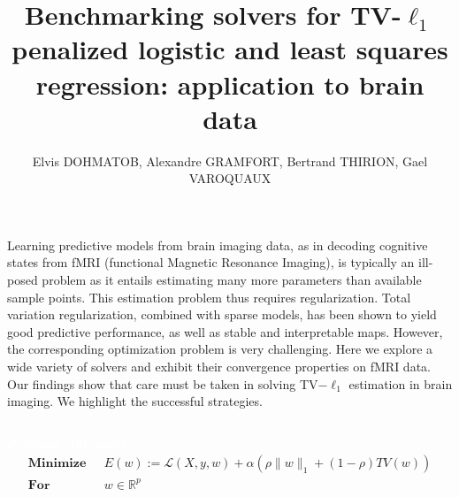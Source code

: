 \documentclass[french]{STIC_poster}
\title{Benchmarking solvers for TV-$\ell_1$ penalized logistic and least squares regression: application to brain data}			%
\author{Elvis DOHMATOB, Alexandre GRAMFORT, Bertrand THIRION, Gael VAROQUAUX}		%
\begin{document}
	\begin{frame}[t]
            Learning predictive models from brain imaging data, as in decoding
            cognitive states from fMRI (functional Magnetic Resonance Imaging),
            is typically an ill-posed problem as it
            entails estimating many more parameters than available sample
            points. This estimation problem thus requires regularization. Total
            variation regularization, combined with sparse models, has been shown
            to yield good predictive performance, as well as stable and
            interpretable maps. However, the corresponding optimization problem is
            very challenging. %
            Here we explore a wide variety of solvers and exhibit
            their convergence properties on fMRI data. %
            Our findings show that care must be taken in solving
            TV$-\ell_1$ estimation in brain imaging. We highlight the successful strategies.
	    \begin{columns}[t]
	      \hfill
	      \begin{column}{.48\linewidth}
		\begin{abox}{\textbf{\textcolor{white}{Problem statement}}}
                                    \begin{equation}
                                      \left .
                                      \begin{split}
                                        \textbf{Minimize} & \text{ } E(w) := \mathcal{L}(X,y,w) + \alpha \left(\rho \|w\|_1 + \left(1-\rho\right)TV(w)\right)\\
                                        \textbf{For} & \text{ } w\in\mathbb{R}^p
                                        \label{eq:opt_pb}
                                      \end{split}

\end{equation}
\end{abox}
\end{column}
\end{columns}
\end{frame}
\end{document}
